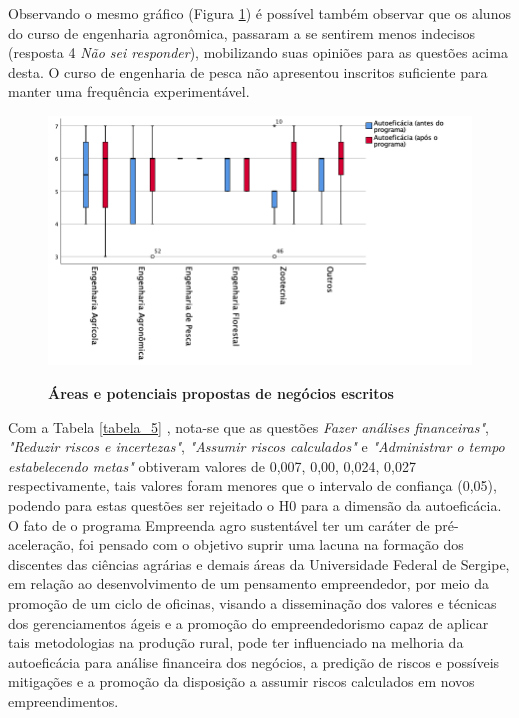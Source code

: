 Observando o mesmo gráfico (Figura \ref{figura_34}) é possível também observar que os alunos do curso de engenharia agronômica, passaram a se sentirem menos indecisos (resposta 4 \textit{Não sei responder}), mobilizando suas opiniões para as questões acima desta. O curso de engenharia de pesca não apresentou inscritos suficiente para manter uma frequência experimentável. 



\begin{figure}[!htb]
\centering
\caption{\textbf{Áreas e potenciais propostas de negócios escritos}}
\includegraphics[scale=0.4]{Imagens/boxplot_autoeficacia.png}
\label{figura_34}
\end{figure}








Com a Tabela \ref{tabela_5} , nota-se que as questões \textit{Fazer análises financeiras"}, \textit{"Reduzir riscos e incertezas"}, \textit{"Assumir riscos calculados"} e \textit{"Administrar o tempo estabelecendo metas"} obtiveram valores de 0,007, 0,00, 0,024, 0,027 respectivamente, tais valores foram menores que o intervalo de confiança (0,05), podendo para estas questões ser rejeitado o H0 para a dimensão da autoeficácia. O fato de o programa Empreenda agro sustentável ter um caráter de pré-aceleração, foi pensado com o objetivo suprir uma lacuna na formação dos discentes das ciências agrárias e demais áreas da Universidade Federal de Sergipe, em relação ao desenvolvimento de um pensamento empreendedor, por meio da promoção de um ciclo de oficinas, visando a disseminação dos valores e técnicas dos gerenciamentos ágeis e a promoção do empreendedorismo capaz de aplicar tais metodologias na produção rural, pode ter influenciado na melhoria da autoeficácia para análise financeira dos negócios, a predição de riscos e possíveis mitigações e a promoção da disposição a assumir riscos calculados em novos empreendimentos.

